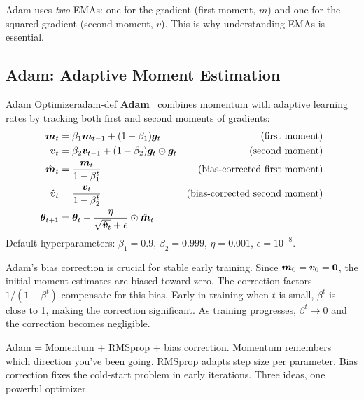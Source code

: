 \documentclass[../../main.tex]{subfiles}
\begin{document}
Adam uses \textit{two} EMAs: one for the gradient (first moment, $m$) and one for the squared gradient (second moment, $v$). This is why understanding EMAs is essential.

\subsection{Adam: Adaptive Moment Estimation}

\begin{definition}{Adam Optimizer}{adam-def}
\textbf{Adam}~\cite{kingma2015adam} combines momentum with adaptive learning rates by tracking both first and second moments of gradients:
\begin{align}
    \vect{m}_t &= \beta_1 \vect{m}_{t-1} + (1 - \beta_1) \vect{g}_t & \text{(first moment)}\index{first moment|textbf} \\
    \vect{v}_t &= \beta_2 \vect{v}_{t-1} + (1 - \beta_2) \vect{g}_t \odot \vect{g}_t & \text{(second moment)}\index{second moment|textbf} \\
    \hat{\vect{m}}_t &= \frac{\vect{m}_t}{1 - \beta_1^t} & \text{(bias-corrected first moment)} \\
    \hat{\vect{v}}_t &= \frac{\vect{v}_t}{1 - \beta_2^t} & \text{(bias-corrected second moment)} \\
    \vect{\theta}_{t+1} &= \vect{\theta}_t - \frac{\eta}{\sqrt{\hat{\vect{v}}_t} + \epsilon} \odot \hat{\vect{m}}_t
\end{align}
Default hyperparameters: $\beta_1 = 0.9$, $\beta_2 = 0.999$, $\eta = 0.001$, $\epsilon = 10^{-8}$.
\end{definition}

\begin{keyconcept}
Adam's bias correction is crucial for stable early training. Since $\boldsymbol{m}_0 = \boldsymbol{v}_0 = \mathbf{0}$, the initial moment estimates are biased toward zero. The correction factors $1/(1 - \beta^t)$ compensate for this bias. Early in training when $t$ is small, $\beta^t$ is close to 1, making the correction significant. As training progresses, $\beta^t \to 0$ and the correction becomes negligible.
\end{keyconcept}

\begin{aha}
Adam = Momentum + RMSprop + bias correction. Momentum remembers which direction you've been going. RMSprop adapts step size per parameter. Bias correction fixes the cold-start problem in early iterations. Three ideas, one powerful optimizer.
\end{aha}
\end{document}

